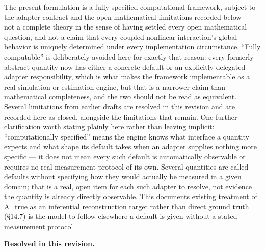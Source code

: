 \documentclass[
]{article}
\begin{document}
The present formulation is a fully specified computational framework,
subject to the adapter contract and the open mathematical limitations
recorded below --- not a complete theory in the sense of having settled
every open mathematical question, and not a claim that every coupled
nonlinear interaction's global behavior is uniquely determined under
every implementation circumstance. ``Fully computable'' is deliberately
avoided here for exactly that reason: every formerly abstract quantity
now has either a concrete default or an explicitly delegated adapter
responsibility, which is what makes the framework implementable as a
real simulation or estimation engine, but that is a narrower claim than
mathematical completeness, and the two should not be read as equivalent.
Several limitations from earlier drafts are resolved in this revision
and are recorded here as closed, alongside the limitations that remain.
One further clarification worth stating plainly here rather than leaving
implicit: ``computationally specified'' means the engine knows what
interface a quantity expects and what shape its default takes when an
adapter supplies nothing more specific --- it does not mean every such
default is automatically observable or requires no real measurement
protocol of its own. Several quantities are called defaults without
specifying how they would actually be measured in a given domain; that
is a real, open item for each such adapter to resolve, not evidence the
quantity is already directly observable. This document\textquotesingle s
existing treatment of A\_true as an inferential reconstruction target
rather than direct ground truth (§14.7) is the model to follow elsewhere
a default is given without a stated measurement protocol.

\textbf{Resolved in this revision.}
\end{document}
